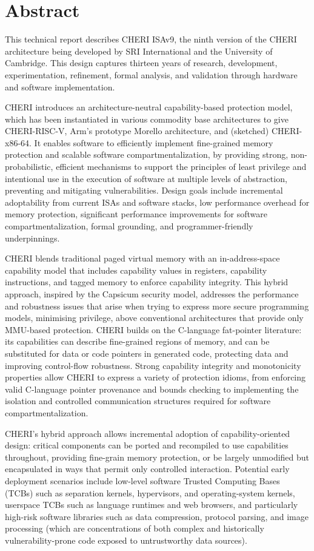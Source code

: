 \section*{Abstract}

This technical report describes CHERI ISAv9, the ninth version of the
CHERI architecture
being developed by SRI International and the University of Cambridge.
This design captures thirteen years of research, development, experimentation,
refinement, formal analysis, and validation through hardware and software
implementation.

CHERI introduces an architecture-neutral capability-based protection
model, which has been instantiated in various commodity base architectures
to give
CHERI-RISC-V, Arm's prototype Morello architecture, and (sketched)
CHERI-x86-64.
It enables software
to efficiently implement fine-grained memory protection and scalable software
compartmentalization, by providing strong, non-probabilistic, efficient
mechanisms to support the principles of least privilege and intentional use
in the execution of software at multiple levels of abstraction, preventing and
mitigating vulnerabilities.
Design goals include incremental adoptability from current ISAs and
software stacks, low performance overhead for memory protection, significant
performance improvements for software compartmentalization, formal grounding,
and programmer-friendly underpinnings.

CHERI blends traditional paged virtual memory with an
in-address-space capability model that includes capability values in registers,
capability instructions, and tagged memory to enforce capability integrity.
This hybrid approach, inspired by the Capsicum security model, addresses the performance and robustness issues that arise
when trying to express more secure programming models, minimising
privilege, above conventional architectures that provide only
MMU-based protection.
CHERI builds on the C-language fat-pointer literature: its capabilities can
describe fine-grained regions of memory, and can be substituted for data or
code pointers in generated code, protecting data and improving
control-flow robustness.
Strong capability integrity and monotonicity properties allow CHERI
to express a variety of protection idioms, from enforcing valid C-language
pointer provenance and bounds checking to implementing the isolation and
controlled communication structures required for software
compartmentalization.

CHERI's hybrid approach allows incremental adoption of capability-oriented design:
critical components can be ported and recompiled to use capabilities throughout,
providing fine-grain memory protection, or be largely unmodified but encapsulated in ways that permit
only controlled interaction.
Potential early deployment scenarios include low-level software Trusted Computing
Bases (TCBs) such as separation kernels, hypervisors, and operating-system
kernels,  userspace TCBs such as language runtimes and web browsers,
and particularly high-risk
software libraries such as data compression, protocol parsing, and image
processing (which are concentrations of both complex and historically
vulnerability-prone code exposed to untrustworthy data sources).

